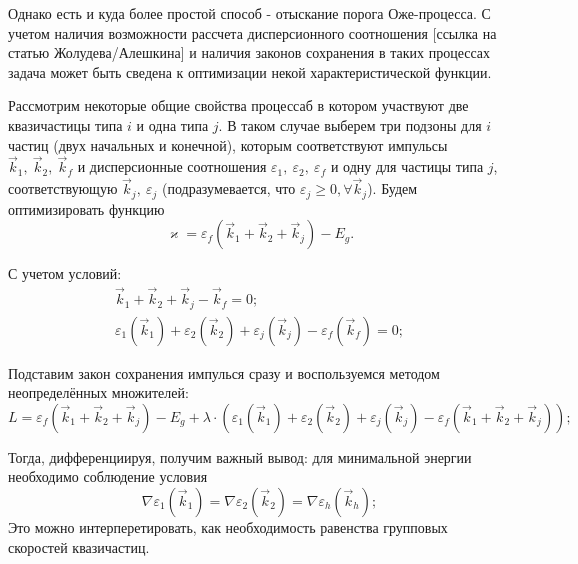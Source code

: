 \documentclass[../main.tex]{subfiles}
\begin{document}
        Однако есть и куда более простой способ - отыскание порога Оже-процесса.
        С учетом наличия возможности рассчета дисперсионного соотношения 
        [ссылка на статью Жолудева/Алешкина] и наличия законов сохранения в таких
        процессах задача может быть сведена к оптимизации некой характеристической
        функции.

        Рассмотрим некоторые общие свойства процессаб в котором участвуют две
        квазичастицы типа $i$ и одна типа $j$. В таком случае выберем три подзоны для 
        $i$ частиц (двух начальных и конечной), которым соответствуют импульсы 
        $\vec{k}_1,~\vec{k}_2,~\vec{k}_f$ и дисперсионные 
        соотношения $\varepsilon_1,~\varepsilon_2,~\varepsilon_f$ и одну для частицы типа $j$,
        соответствующую $\vec{k}_j,~\varepsilon_j$ (подразумевается, что 
        $\varepsilon_j \geq 0, \forall \vec{k}_j$). Будем оптимизировать функцию 
        \begin{equation}
            \varkappa = \varepsilon_f(\vec{k}_1 + \vec{k}_2 + \vec{k}_j) - E_g.
        \end{equation}

        С учетом условий:
        \begin{eqnarray}
            \vec{k}_1 + \vec{k}_2 + \vec{k}_j - \vec{k}_f = 0;\\
            \varepsilon_1(\vec{k}_1) + \varepsilon_2(\vec{k}_2) + \varepsilon_j(\vec{k}_j) - \varepsilon_f(\vec{k}_f) = 0;
        \end{eqnarray}

        Подставим закон сохранения импулься сразу и воспользуемся методом неопределённых множителей:
        \begin{equation}
            L = \varepsilon_f(\vec{k}_1 + \vec{k}_2 + \vec{k}_j) - E_g + \lambda \cdot \left(\varepsilon_1(\vec{k}_1) + 
            \varepsilon_2(\vec{k}_2) + \varepsilon_j(\vec{k}_j) - \varepsilon_f(\vec{k}_1 + \vec{k}_2 + \vec{k}_j)\right);
        \end{equation}

        Тогда, дифференциируя, получим важный  вывод: для минимальной энергии необходимо соблюдение условия
        \begin{equation}
            \nabla \varepsilon_1(\vec{k}_1) = \nabla \varepsilon_2(\vec{k}_2) = \nabla \varepsilon_h(\vec{k}_h);
        \end{equation}
        Это можно интерперетировать, как необходимость равенства групповых скоростей квазичастиц.
        
\end{document}
